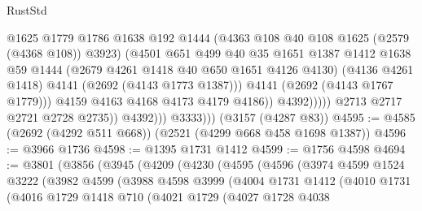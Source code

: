\begin{lexlean}{RustStd}
\begin{coremodule}
                                    @1625
                                    @1779
                                    @1786
                                    @1638
                                    @192
                                    @1444
                                    (@4363 @108 @40 @108 @1625 (@2579 (@4368 @108)) @3923)
                                    (@4501
                                      @651
                                      @499
                                      @40
                                      @35
                                      @1651
                                      @1387
                                      @1412
                                      @1638
                                      @59
                                      @1444
                                      (@2679 @4261 @1418 @40 @650 @1651 @4126 @4130)
                                      (@4136 @4261 @1418)
                                      @4141
                                      (@2692 (@4143 @1773 @1387)))
                                    @4141
                                    (@2692 (@4143 @1767 @1779)))
                                  @4159
                                  @4163
                                  @4168
                                  @4173
                                  @4179
                                  @4186))
                              @4392)))))
                    @2713
                    @2717
                    @2721
                    @2728
                    @2735))
                @4392)))
          @3333)))
    (@3157 (@4287 @83))
@4595 := @4585 (@2692 (@4292 @511 @668)) (@2521 (@4299 @668 @458 @1698 @1387))
@4596 := @3966 @1736
@4598 := @1395 @1731 @1412
@4599 := @1756 @4598
@4694 := @3801
    (@3856
      (@3945
        (@4209
          (@4230
            (@4595
              (@4596
                (@3974
                  @4599
                  @1524
                  @3222
                  (@3982
                    @4599
                    (@3988
                      @4598
                      @3999
                      (@4004
                        @1731
                        @1412
                        (@4010
                          @1731
                          (@4016
                            @1729
                            @1418
                            @710
                            (@4021
                              @1729
                              (@4027
                                @1728
                                @4038

\end{coremodule}
\end{lexlean}
